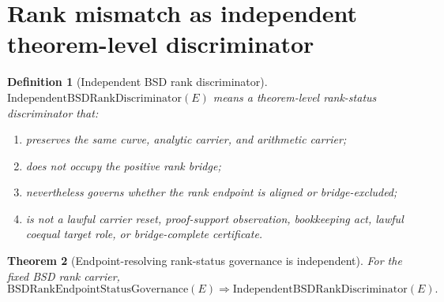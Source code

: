 \documentclass[11pt]{article}
\newtheorem{theorem}{Theorem}[section]
\newtheorem{definition}[theorem]{Definition}
\begin{document}
\section{Rank mismatch as independent theorem-level discriminator}

\begin{definition}[Independent BSD rank discriminator]
$\mathrm{IndependentBSDRankDiscriminator}(E)$ means a theorem-level rank-status discriminator that:
\begin{enumerate}[label=(\alph*)]
\item preserves the same curve, analytic carrier, and arithmetic carrier;
\item does not occupy the positive rank bridge;
\item nevertheless governs whether the rank endpoint is aligned or bridge-excluded;
\item is not a lawful carrier reset, proof-support observation, bookkeeping act, lawful coequal target role, or bridge-complete certificate.
\end{enumerate}
\end{definition}

\begin{theorem}[Endpoint-resolving rank-status governance is independent]\label{thm:governance-independent-rank}
For the fixed BSD rank carrier,
\[
\mathrm{BSDRankEndpointStatusGovernance}(E)
\Rightarrow
\mathrm{IndependentBSDRankDiscriminator}(E).
\]
\end{theorem}
\end{document}
